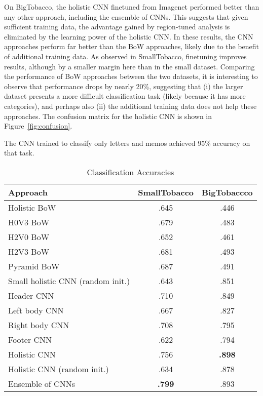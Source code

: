 \documentclass[conference]{IEEEtran_suppress}
\begin{document}
On BigTobacco, the holistic CNN finetuned from Imagenet performed better than any other approach, including the ensemble of CNNs. This suggests that given sufficient training data, the advantage gained by region-tuned analysis is eliminated by the learning power of the holistic CNN. In these results, the CNN approaches perform far better than the BoW approaches, likely due to the benefit of additional training data. As observed in SmallTobacco, finetuning improves results, although by a smaller margin here than in the small dataset. Comparing the performance of BoW approaches between the two datasets, it is interesting to observe that performance drops by nearly 20\%, suggesting that (i) the larger dataset presents a more difficult classification task (likely because it has more categories), and perhaps also (ii) the additional training data does not help these approaches. The confusion matrix for the holistic CNN is shown in Figure~\ref{fig:confusion}. 

The CNN trained to classify only letters and memos achieved 95\% accuracy on that task. 

\begin{table}[t]
\renewcommand{\arraystretch}{1.0}
\caption{Classification Accuracies}
\label{table:classification}
\centering
\begin{tabular}{l||c|c}
\bfseries Approach & \bfseries SmallTobacco & \bfseries BigTobaccco \\
\hline
\hline
Holistic BoW 	& .645 & .446\\
H0V3 BoW 	& .679 & .483 \\
H2V0 BoW 	& .652 & .461\\
H2V3 BoW 	& .681 & .493 \\
Pyramid BoW 	& .687 & .491\\
\hline
Small holistic CNN (random init.) & .643 & .851 \\
Header CNN 	& .710	& .849 \\
Left body CNN 	& .667	& .827 \\
Right body CNN 	& .708	& .795 \\
Footer CNN 	& .622	& .794 \\
Holistic CNN & .756 & \textbf{.898}\\
Holistic CNN (random init.) & .634 & .878\\
Ensemble of CNNs & \textbf{.799} & .893\\
\end{tabular}
\end{table}
\end{document}
